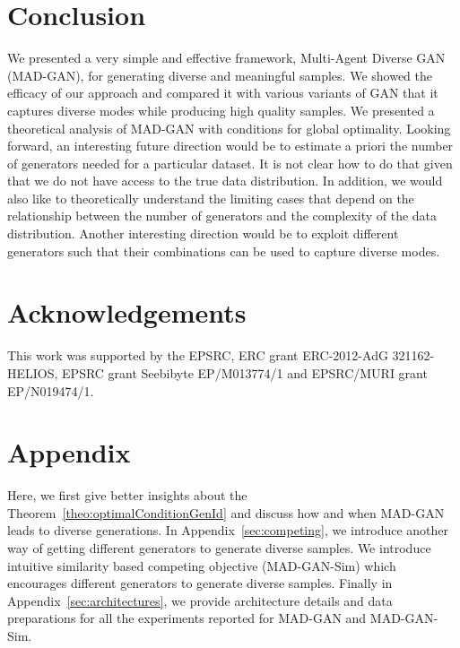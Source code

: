 \section{Conclusion}
We presented a very simple and effective framework, Multi-Agent Diverse GAN (MAD-GAN), for generating diverse and meaningful samples. We showed the efficacy of our approach and compared it with various variants of GAN that it captures diverse modes while producing high quality samples. We presented a theoretical analysis of MAD-GAN with conditions for global optimality. Looking forward, an interesting future direction would be to estimate a priori the number of generators needed for a particular dataset. It is not clear how to do that given that we do not have access to the true data distribution. In addition, we would also like to theoretically understand the limiting cases that depend on the relationship between the number of generators and the complexity of the data distribution. Another interesting direction would be to exploit different generators such that their combinations can be used to capture diverse modes. 

\section{Acknowledgements}
This work was supported by the EPSRC, ERC grant ERC-2012-AdG 321162-HELIOS, EPSRC grant Seebibyte EP/M013774/1 and EPSRC/MURI grant EP/N019474/1.

{\small
	
	
}

\newpage

\section{Appendix}
Here, we first give better insights about the Theorem~\ref{theo:optimalConditionGenId} and discuss how and when MAD-GAN leads to diverse generations. In Appendix~\ref{sec:competing}, we introduce another way of getting different generators to generate diverse samples. We introduce intuitive similarity based competing objective (MAD-GAN-Sim) which encourages different generators to generate diverse samples. Finally in Appendix~\ref{sec:architectures}, we provide architecture details and data preparations for all the experiments reported for MAD-GAN and MAD-GAN-Sim.

